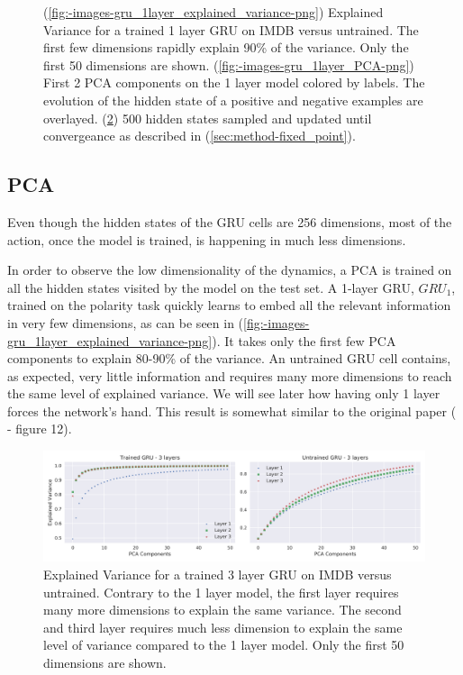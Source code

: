 \documentclass{article}
\begin{document}
\begin{figure}[H]
\begin{subfigure}[b]{0.32\linewidth}
    \caption{}
    \label{fig:-images-gru_1layer_fixed_points-png}
  \end{subfigure}
  \caption{
    (\ref{fig:-images-gru_1layer_explained_variance-png})
    Explained Variance for a trained 1 layer GRU on IMDB versus untrained. 
    The first few dimensions rapidly explain 90\% of the variance. Only the first 50 dimensions are shown.  
    (\ref{fig:-images-gru_1layer_PCA-png})
    First 2 PCA components on the 1 layer model colored by labels. The evolution of the 
    hidden state of a positive and negative examples are overlayed.
    (\ref{fig:-images-gru_1layer_fixed_points-png})
    500 hidden states sampled and updated until convergeance as described in (\ref{sec:method-fixed_point}).
  }
\end{figure}

\subsection{PCA}

Even though the hidden states of the GRU cells are 256 dimensions, most of the action, once the model is trained, is happening in much less dimensions.

In order to observe the low dimensionality of the dynamics, a PCA is trained on all the hidden states visited by the model on the test set. A 1-layer GRU, $GRU_1$, trained on the polarity task quickly learns to embed all the relevant information in very few dimensions, as can be seen in (\ref{fig:-images-gru_1layer_explained_variance-png}). It takes only the first few PCA components to explain 80-90\% of the variance. An untrained GRU cell contains, as expected, very little information and requires many more dimensions to reach the same level of explained variance. We will see later how having only 1 layer forces the network's hand. This result is somewhat similar to the original paper (\cite{maheswaranathan2019reverse} - figure 12).

\begin{figure}[H]
  \centering
  \includegraphics[width=1\textwidth]{../images/gru_3layer_100_explained_variance.png}
  \caption{Explained Variance for a trained 3 layer GRU on IMDB versus untrained. 
    Contrary to the 1 layer model, the first layer requires many more dimensions 
    to explain the same variance. The second and third layer requires much less dimension 
    to explain the same level of variance compared to the 1 layer model. Only the first 50 dimensions are shown.
  }
  \label{fig:-images-gru_3layer_explained_variance-png}
\end{figure}
\end{document}
